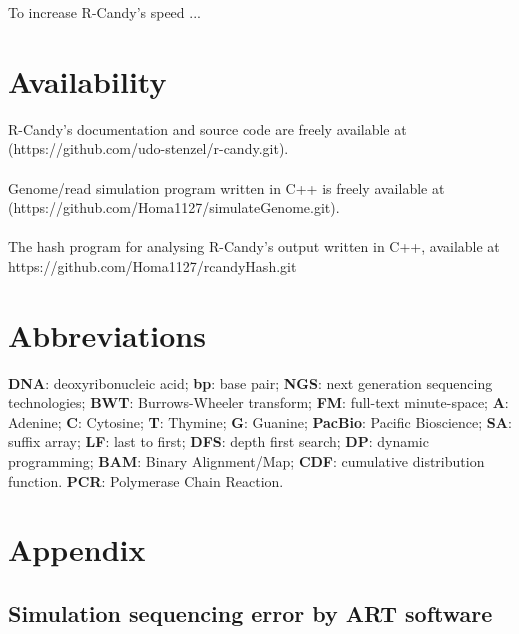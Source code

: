 \documentclass[11pt,a4paper]{report}
\begin{document}
To increase R-Candy's speed  ...






\section{Availability} \label{Availability}

R-Candy's documentation and source code are freely available at\\
 (https://github.com/udo-stenzel/r-candy.git).
\\\\
Genome/read simulation program written in C++ is freely available at
(https://github.com/Homa1127/simulateGenome.git).
\\\\
The hash program for analysing R-Candy's output written in C++, available at
https://github.com/Homa1127/rcandyHash.git




\section{Abbreviations} \label{Abbreviations}

\textbf{DNA}: deoxyribonucleic acid;
\textbf{bp}: base pair;
\textbf{NGS}: next generation sequencing technologies;
\textbf{BWT}: Burrows-Wheeler transform;
\textbf{FM}: full-text minute-space;
\textbf{A}: Adenine;
\textbf{C}: Cytosine;
\textbf{T}: Thymine;
\textbf{G}: Guanine;
\textbf{PacBio}: Pacific Bioscience;
\textbf{SA}: suffix array;
\textbf{LF}: last to first;
\textbf{DFS}: depth first search;
\textbf{DP}: dynamic programming;
\textbf{BAM}: Binary Alignment/Map;
\textbf{CDF}: cumulative distribution function.
\textbf{PCR}: Polymerase Chain Reaction.




\newpage
\appendix
\section*{Appendix}
\renewcommand{\thesubsection}{\Alph{subsection}}

\subsection{Simulation sequencing error by ART software} 
\label{Simulation sequencing error by ART software}
\end{document}
